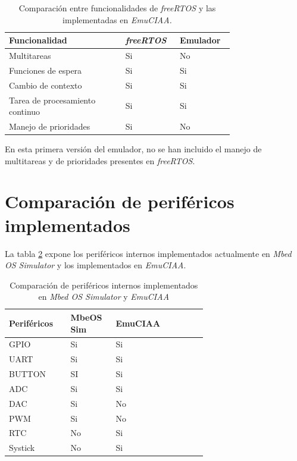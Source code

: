 \begin{table}[h]
\centering
\caption[Comparación entre funcionalidades de \textit{freeRTOS} que se cumplen en el emulador.]{Comparación entre funcionalidades de \textit{freeRTOS} y las implementadas en \textit{EmuCIAA.}}
\begin{tabular}{p{0.45\linewidth} p{0.15\linewidth}  p{0.15\linewidth}}
\toprule
\textbf{Funcionalidad} 
& \textbf{\textit{freeRTOS}}
& \textbf{Emulador}
\\
\midrule
Multitareas & Si & No  \\
Funciones de espera &  Si & Si \\
Cambio de contexto &  Si & Si \\
Tarea de procesamiento continuo &  Si & Si \\
Manejo de prioridades & Si & No  \\
\bottomrule
\hline
\end{tabular}
\label{tab:ConceptosRTOS}
\end{table}

En esta primera versión del emulador, no se han incluido el manejo de multitareas y de prioridades presentes en \textit{freeRTOS}.

\section{Comparación de periféricos implementados}

La tabla \ref{tab:perifericosInternosMBED} expone los  periféricos internos implementados actualmente en \textit{Mbed OS Simulator} y los implementados en \textit{EmuCIAA}.

\begin{table}[htbp]
\centering
\caption[Periféricos internos implementados]{Comparación de periféricos internos implementados en \textit{Mbed OS Simulator} y  \textit{EmuCIAA}}
\begin{tabular}{p{0.24\linewidth} p{0.14\linewidth}  p{0.14\linewidth}  p{0.14\linewidth}}
\toprule
\textbf{Periféricos} 
& \textbf{MbeOS Sim}
& \textbf{EmuCIAA}
\\
\midrule
GPIO & Si & Si  \\
UART & Si & Si \\
BUTTON & SI & Si \\
ADC & Si & Si \\
DAC & Si & No \\
PWM & Si & No \\ 
RTC & No & Si \\ 
Systick & No & Si \\ 
\bottomrule
\hline
\end{tabular}
\label{tab:perifericosInternosMBED}
\end{table}

